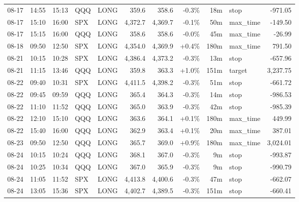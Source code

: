 \documentclass[11pt,a4paper,twoside]{article}
\begin{document}
\begin{center}
\begin{longtable}{>{\color{txtmain}}l l l l l r r r r >{\color{txtmain}}l r}
08-17 & 14:55 & 15:13 & QQQ & LONG & 359.6 & 358.6 & \textcolor{lossred}{-0.3\%} & 18m & stop & \textcolor{lossred}{-971.05} \\
08-17 & 15:10 & 16:00 & SPX & LONG & 4,372.7 & 4,369.7 & \textcolor{lossred}{-0.1\%} & 50m & max\_time & \textcolor{lossred}{-149.50} \\
08-17 & 15:15 & 16:00 & QQQ & LONG & 358.6 & 358.6 & \textcolor{lossred}{-0.0\%} & 45m & max\_time & \textcolor{lossred}{-26.99} \\
08-18 & 09:50 & 12:50 & SPX & LONG & 4,354.0 & 4,369.9 & \textcolor{wingreen}{+0.4\%} & 180m & max\_time & \textcolor{wingreen}{791.50} \\
08-21 & 10:15 & 10:28 & SPX & LONG & 4,386.4 & 4,373.2 & \textcolor{lossred}{-0.3\%} & 13m & stop & \textcolor{lossred}{-657.96} \\
08-21 & 11:15 & 13:46 & QQQ & LONG & 359.8 & 363.3 & \textcolor{wingreen}{+1.0\%} & 151m & target & \textcolor{wingreen}{3,237.75} \\
08-22 & 09:40 & 10:31 & SPX & LONG & 4,411.5 & 4,398.2 & \textcolor{lossred}{-0.3\%} & 51m & stop & \textcolor{lossred}{-661.72} \\
08-22 & 09:45 & 09:59 & QQQ & LONG & 365.4 & 364.3 & \textcolor{lossred}{-0.3\%} & 14m & stop & \textcolor{lossred}{-986.53} \\
08-22 & 11:10 & 11:52 & QQQ & LONG & 365.0 & 363.9 & \textcolor{lossred}{-0.3\%} & 42m & stop & \textcolor{lossred}{-985.39} \\
08-22 & 12:10 & 15:10 & QQQ & LONG & 363.6 & 364.1 & \textcolor{wingreen}{+0.1\%} & 180m & max\_time & \textcolor{wingreen}{449.99} \\
08-22 & 15:40 & 16:00 & QQQ & LONG & 362.9 & 363.4 & \textcolor{wingreen}{+0.1\%} & 20m & max\_time & \textcolor{wingreen}{387.01} \\
08-23 & 09:50 & 12:50 & QQQ & LONG & 365.7 & 369.0 & \textcolor{wingreen}{+0.9\%} & 180m & max\_time & \textcolor{wingreen}{3,024.01} \\
08-24 & 10:15 & 10:24 & QQQ & LONG & 368.1 & 367.0 & \textcolor{lossred}{-0.3\%} & 9m & stop & \textcolor{lossred}{-993.87} \\
08-24 & 10:25 & 10:34 & QQQ & LONG & 367.0 & 365.9 & \textcolor{lossred}{-0.3\%} & 9m & stop & \textcolor{lossred}{-990.79} \\
08-24 & 11:05 & 11:52 & SPX & LONG & 4,413.8 & 4,400.6 & \textcolor{lossred}{-0.3\%} & 47m & stop & \textcolor{lossred}{-662.07} \\
08-24 & 13:05 & 15:36 & SPX & LONG & 4,402.7 & 4,389.5 & \textcolor{lossred}{-0.3\%} & 151m & stop & \textcolor{lossred}{-660.41} \\

\end{longtable}
\end{center}
\end{document}
